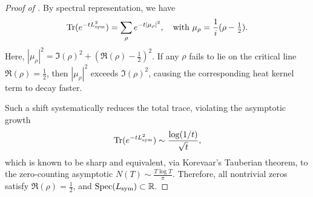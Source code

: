 \begin{proof}[Proof of ]
By spectral representation, we have
\[
\operatorname{Tr}(e^{-t L_{\mathrm{sym}}^2}) = \sum_{\rho} e^{-t |\mu_\rho|^2}, \quad \text{with } \mu_\rho = \frac{1}{i}(\rho - \tfrac{1}{2}).
\]
Here, $|\mu_\rho|^2 = \Im(\rho)^2 + (\Re(\rho) - \tfrac{1}{2})^2$. If any $\rho$ fails to lie on the critical line $\Re(\rho) = \tfrac{1}{2}$, then $|\mu_\rho|^2$ exceeds $\Im(\rho)^2$, causing the corresponding heat kernel term to decay faster.

Such a shift systematically reduces the total trace, violating the asymptotic growth
\[
\operatorname{Tr}(e^{-t L_{\mathrm{sym}}^2}) \sim \frac{\log(1/t)}{\sqrt{t}},
\]
which is known to be sharp and equivalent, via Korevaar's Tauberian theorem, to the zero-counting asymptotic $N(T) \sim \frac{T \log T}{\pi}$. Therefore, all nontrivial zeros satisfy $\Re(\rho) = \tfrac{1}{2}$, and $\operatorname{Spec}(L_{\mathrm{sym}}) \subset \mathbb{R}$.
\end{proof}